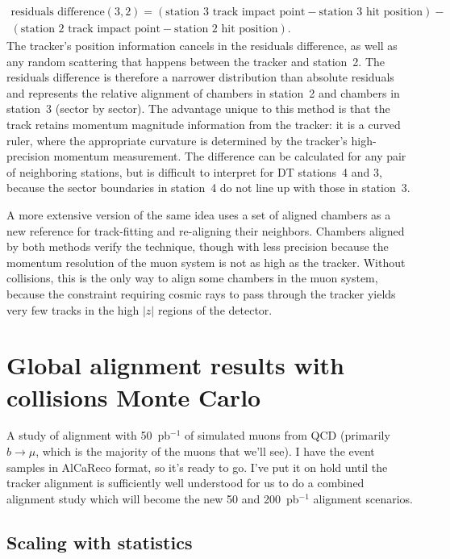 \documentclass[12pt]{article}
\begin{document}
\begin{multline}
\mbox{residuals difference}(3, 2) = (\mbox{station 3 track impact point} - \mbox{station 3 hit position}) - \\
(\mbox{station 2 track impact point} - \mbox{station 2 hit position})\mbox{.}
\end{multline}
The tracker's position information cancels in the residuals
difference, as well as any random scattering that happens between the
tracker and station~2.  The residuals difference is therefore a
narrower distribution than absolute residuals and represents the
relative alignment of chambers in station~2 and chambers in station~3
(sector by sector).  The advantage unique to this method is that the
track retains momentum magnitude information from the tracker: it is a
curved ruler, where the appropriate curvature is determined by the
tracker's high-precision momentum measurement.  The difference can be
calculated for any pair of neighboring stations, but is difficult to
interpret for DT stations~4 and 3, because the sector boundaries in
station~4 do not line up with those in station~3.

A more extensive version of the same idea uses a set of aligned
chambers as a new reference for track-fitting and re-aligning their
neighbors.  Chambers aligned by both methods verify the technique,
though with less precision because the momentum resolution of the muon
system is not as high as the tracker.  Without collisions, this is the
only way to align some chambers in the muon system, because the
constraint requiring cosmic rays to pass through the tracker yields
very few tracks in the high $|z|$ regions of the detector.

\section{Global alignment results with collisions Monte Carlo}
\label{sec:mcstudy}

A study of alignment with 50~pb$^{-1}$ of simulated muons from QCD
(primarily $b\to\mu$, which is the majority of the muons that we'll
see).  I have the event samples in AlCaReco format, so it's ready to
go.  I've put it on hold until the tracker alignment is sufficiently
well understood for us to do a combined alignment study which will
become the new 50 and 200~pb$^{-1}$ alignment scenarios.

\subsection{Scaling with statistics}
\end{document}

